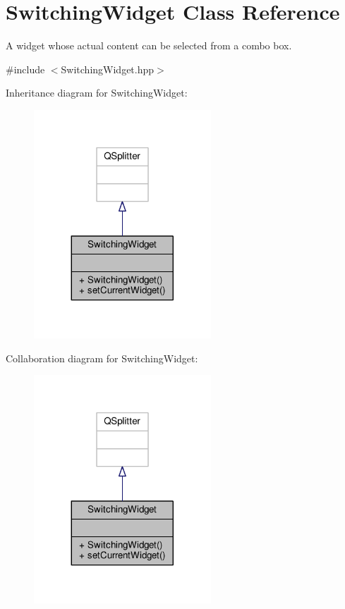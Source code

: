 \hypertarget{class_switching_widget}{}\section{Switching\+Widget Class Reference}
\label{class_switching_widget}


A widget whose actual content can be selected from a combo box.  




{\ttfamily \#include $<$Switching\+Widget.\+hpp$>$}



Inheritance diagram for Switching\+Widget\+:
\nopagebreak
\begin{figure}[H]
\begin{center}
\leavevmode
\includegraphics[width=188pt]{class_switching_widget__inherit__graph}
\end{center}
\end{figure}


Collaboration diagram for Switching\+Widget\+:
\nopagebreak
\begin{figure}[H]
\begin{center}
\leavevmode
\includegraphics[width=188pt]{class_switching_widget__coll__graph}
\end{center}
\end{figure}
